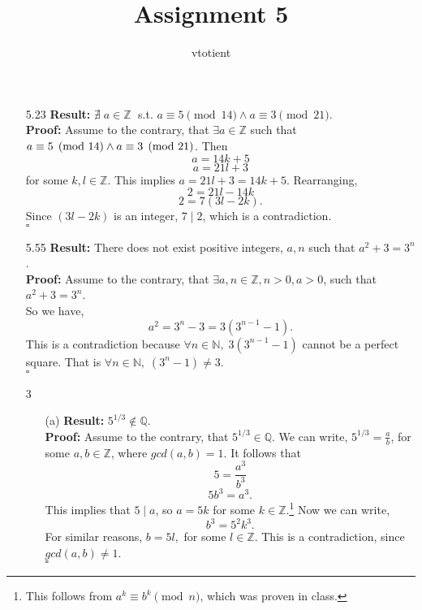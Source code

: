 \documentclass[12pt]{article}
\begin{document}
 
 
 
\title{Assignment 5}%
\author{vtotient\\}
 
\maketitle
        
    \begin{enumerate}
        \item [5.23] 
            \textbf{Result: }$\nexists \; a\in\mathbb{Z}\;$ s.t. $a\equiv 5\pmod{14} \land a\equiv 3\pmod{21}$. \\
            \textbf{Proof: }Assume to the contrary, that $\exists a \in\mathbb{Z}$ such that $a\equiv 5\pmod{14} \land \\ a\equiv 3\pmod{21}$. Then 
            $$a=14k+5$$
            $$a=21l+3$$
            for some $k,l\in\mathbb{Z}$. This implies $a=21l+3=14k+5$. Rearranging, 
            $$2=21l-14k$$
            $$2=7(3l-2k).$$
            Since $(3l-2k)$ is an integer, $7\mid 2$, which is a contradiction. 
            \\$\square$
            
        \item [5.55]
            \textbf{Result: }There does not exist positive integers, $a,n$ such that $a^2+3=3^n$. \\
            \textbf{Proof: }Assume to the contrary, that $\exists a,n\in\mathbb{Z},n>0,a>0$, such that $a^2+3=3^n$. \\
            So we have, 
            $$a^2=3^n-3=3(3^{n-1}-1).$$
            This is a contradiction because $\forall n\in\mathbb{N}, \; 3(3^{n-1}-1)$ cannot be a perfect square. That is $\forall n\in\mathbb{N}, \;(3^n-1)\neq 3$.
            \\$\square$
        
        \item [3]
            \begin{enumerate}
                \item [(a)] \textbf{Result: }$5^{1/3}\notin\mathbb{Q}$. \\
                \textbf{Proof: }Assume to the contrary, that $5^{1/3}\in\mathbb{Q}$. We can write, $5^{1/3}=\frac{a}{b}$, for some $a,b\in\mathbb{Z}$, where $gcd(a,b)=1$. It follows that
                $$5=\frac{a^3}{b^3}$$
                $$5b^3=a^3.$$
                This implies that $5\mid a$, so $a=5k$ for some $k\in\mathbb{Z}$.\footnote{This follows from $a^k\equiv b^k\pmod{n}$, which was proven in class.} 
                \newpage
                Now we can write,
                $$b^3=5^2k^3.$$ For similar reasons, $b=5l,$ for some $l\in\mathbb{Z}$. This is a contradiction, since $gcd(a,b)\neq 1$.
                \\$\square$
                

\end{enumerate}
\end{enumerate}
\end{document}
